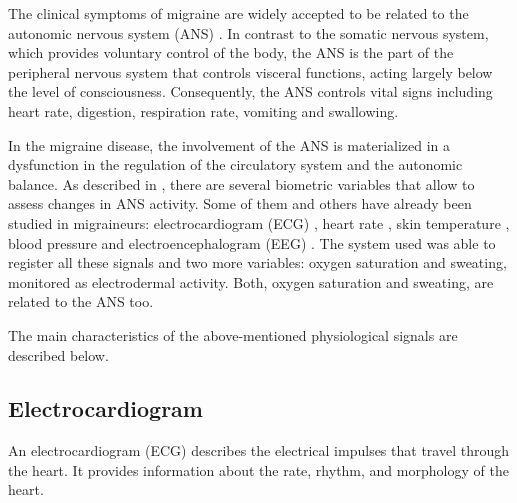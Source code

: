 
\label{sec:setup:phys-signals}

The clinical symptoms of migraine are widely accepted to be related to the autonomic nervous system (ANS) \cite{melek2007autonomic, sanya2005impairment, barbanti2013dopaminergic, gass2013autonomic, becker2013premonitory, hassinger1999cardiovascular}. In contrast to the somatic nervous system, which provides voluntary control of the body, the ANS is the part of the peripheral nervous system that controls visceral functions, acting largely below the level of consciousness. Consequently, the ANS controls vital signs including heart rate, digestion, respiration rate, vomiting and swallowing.


In the migraine disease, the involvement of the ANS is materialized in a dysfunction in the regulation of the circulatory system and the autonomic balance. As described in \cite{mendes2009assessing}, there are several biometric variables that allow to assess changes in ANS activity. Some of them and others have already been studied in migraineurs: electrocardiogram (ECG) \cite{melek2007autonomic, aygun2003electrocardiographic}, heart rate \cite{pmid23853566, pmid19925627}, skin temperature \cite{zaproudina2013acral, ordas2013increase}, blood pressure \cite{pietrini2005hypertension, pmid19925627} and electroencephalogram (EEG) \cite{bjork2011initiates}. The system used was able to register all these signals and two more variables: oxygen saturation and sweating, monitored as electrodermal activity. Both, oxygen saturation and sweating, are related to the ANS too.

The main characteristics of the above-mentioned physiological signals are described below. 

\subsection{Electrocardiogram}
\label{subsec:setup:phys-signals:ecg}

An electrocardiogram (ECG) describes the electrical impulses that travel through the heart. It provides information about the rate, rhythm, and morphology of the heart.

